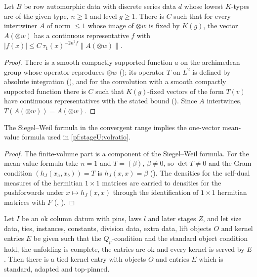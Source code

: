 \begin{lemma}\label{pf:stageU:contrep}
Let $B$ be row automorphic data with discrete series data $d$ whose lowest $K$-types are of the given type, $n\ge1$ and level $g\ge1$.
There is $C$ such that for every intertwiner $A$ of norm $\le1$ whose image of $\otimes w$ is fixed by $K(g)$, the vector $A(\otimes w)$
has a continuous representative $f$ with $|f(x)|\le C\,\tau_1(x)^{-2n^2f}\|A(\otimes w)\|$.
\end{lemma}

\begin{proof}
There is a smooth compactly supported function $a$ on the archimedean group whose operator reproduces $\otimes w$
(); its operator $T$ on $L^2$ is defined by absolute integration
(), and for the convolution with a smooth compactly supported function there is $C$ such that
$K(g)$-fixed vectors of the form $T(v)$ have continuous representatives with the stated bound
(). Since $A$ intertwines, $T(A(\otimes w))=A(\otimes w)$.
\end{proof}

\begin{lemma}\label{pf:stageU:onevec}
The Siegel--Weil formula in the convergent range implies the one-vector mean-value formula used in \cref{pf:stageU:volratio}.
\end{lemma}

\begin{proof}
The finite-volume part is a component of the Siegel--Weil formula. For the mean-value formula take $n=1$ and $T=(\beta)$, $\beta\ne0$, so
$\det T\ne0$ and the Gram condition $(h_J(x_a,x_b))=T$ is $h_J(x,x)=\beta$ (). The
densities for the self-dual measures of the hermitian $1\times1$ matrices are carried to densities for the pushforwards under
$x\mapsto h_J(x,x)$ through the identification of $1\times1$ hermitian matrices with $F$ (,
).
\end{proof}

\begin{lemma}\label{pf:stageU:kerent}
Let $I$ be an ok column datum with pins, laws $l$ and later stages $Z$, and let size data, ties, instances, constants, division data,
extra data, lift objects $O$ and kernel entries $E$ be given such that the $Q_p$-condition and the standard object condition hold, the
unfolding is complete, the entries are ok and every kernel is served by $E$. Then there is a tied kernel entry with objects $O$ and
entries $E$ which is standard, adapted and top-pinned.
\end{lemma}

